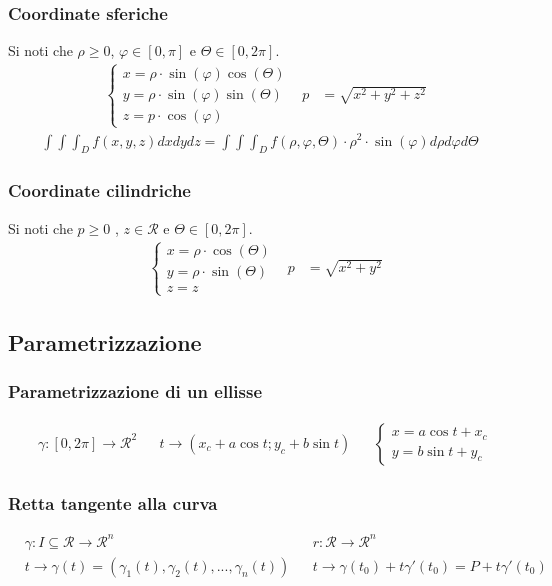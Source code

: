 \documentclass[a4paper]{article}
\begin{document}
	\subsubsection{Coordinate sferiche}
	Si noti che $\rho \ge 0$, $\varphi \in [0,\pi]$ e $\varTheta \in [0,2\pi]$.
	\begin{align*}
		&\begin{cases}
			x = \rho \cdot \sin(\varphi)\cos(\varTheta)\\
			y = \rho \cdot \sin(\varphi)\sin(\varTheta)\\
			z = p \cdot \cos(\varphi)
		\end{cases}	&	p &= \sqrt{x^2+y^2+z^2}
	\end{align*}
	\begin{align*}
				\int \int \int_{D}f(x,y,z)dxdydz = \int \int \int_D f(\rho,\varphi,\varTheta) \cdot \rho^2 \cdot \sin(\varphi) d\rho d\varphi d\varTheta
	\end{align*}
	\subsubsection{Coordinate cilindriche}
	Si noti che $p \ge 0$ , $z \in \mathcal{R}$ e $\varTheta \in [0,2\pi]$.
	\begin{align*}
		&\begin{cases}
		x = \rho \cdot \cos(\varTheta)\\
		y = \rho \cdot \sin(\varTheta)\\
		z=z
		\end{cases}	&	p &= \sqrt{x^2+y^2}
	\end{align*}
	
	\subsection{Parametrizzazione}
	\subsubsection{Parametrizzazione di un ellisse}
	\begin{align*}
		&\gamma: [0,2\pi] \to \mathcal{R}^2	&	&t\to (x_c + a \cos t ; y_c + b \sin t)	&	&
		\begin{cases}
		x = a\cos t + x_c\\
		y = b \sin t + y_c
		\end{cases}
	\end{align*}
	\subsubsection{Retta tangente alla curva}
	\begin{align*}
		&\gamma: I \subseteq \mathcal{R} \to \mathcal{R}^n	&	&r: \mathcal{R} \to \mathcal{R}^n\\
		&t \to \gamma (t) = (\gamma_1 (t),\gamma_2 (t),...,\gamma_n (t))	&	&t \to \gamma (t_0) + t\gamma' (t_0) = P + t\gamma' (t_0)
	\end{align*}
\end{document}
